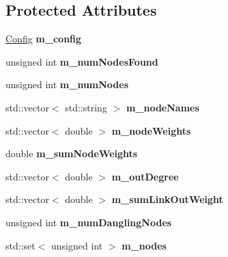 \subsection*{Protected Attributes}
\begin{DoxyCompactItemize}
\item 
\mbox{\label{classNetwork_a4e804bbdb49f3d6b61424da9d2631668}} 
\mbox{\hyperlink{structConfig}{Config}} {\bfseries m\+\_\+config}
\item 
\mbox{\label{classNetwork_a6b78eccd117b8dad6b09cccec682a4d8}} 
unsigned int {\bfseries m\+\_\+num\+Nodes\+Found}
\item 
\mbox{\label{classNetwork_ae539ca2af09a33f50a645862f3d45066}} 
unsigned int {\bfseries m\+\_\+num\+Nodes}
\item 
\mbox{\label{classNetwork_a889a68a5d059237119d6fea176b56da8}} 
std\+::vector$<$ std\+::string $>$ {\bfseries m\+\_\+node\+Names}
\item 
\mbox{\label{classNetwork_ac00cd6865db2dce075af1e46df45cefc}} 
std\+::vector$<$ double $>$ {\bfseries m\+\_\+node\+Weights}
\item 
\mbox{\label{classNetwork_a10f2a6a98453c5e3a8aaadbfdbd7f99d}} 
double {\bfseries m\+\_\+sum\+Node\+Weights}
\item 
\mbox{\label{classNetwork_adbb0d2ba1256d2059c9d33b695a7656a}} 
std\+::vector$<$ double $>$ {\bfseries m\+\_\+out\+Degree}
\item 
\mbox{\label{classNetwork_a9b7d73fd01e7c6f99365cd4e0fe56ba0}} 
std\+::vector$<$ double $>$ {\bfseries m\+\_\+sum\+Link\+Out\+Weight}
\item 
\mbox{\label{classNetwork_a01a423d5d1bb3d5d76121394b54f1597}} 
unsigned int {\bfseries m\+\_\+num\+Dangling\+Nodes}
\item 
\mbox{\label{classNetwork_aa1bcf1f8cdee488a9d081a05b5fb40ea}} 
std\+::set$<$ unsigned int $>$ {\bfseries m\+\_\+nodes}
\item 
\mbox{\label{classNetwork_a405b5ada50d270ae69d1db7fd276406a}} 

\end{DoxyCompactItemize}

